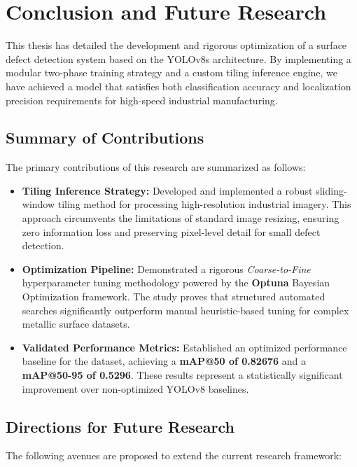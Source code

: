 \chapter{Conclusion and Future Research}
\label{chap:conclusion}

This thesis has detailed the development and rigorous optimization of a surface defect detection system based on the YOLOv8s architecture. By implementing a modular two-phase training strategy and a custom tiling inference engine, we have achieved a model that satisfies both classification accuracy and localization precision requirements for high-speed industrial manufacturing.

\section{Summary of Contributions}

The primary contributions of this research are summarized as follows:

\begin{itemize}
    \item \textbf{Tiling Inference Strategy:} Developed and implemented a robust sliding-window tiling method for processing high-resolution industrial imagery. This approach circumvents the limitations of standard image resizing, ensuring zero information loss and preserving pixel-level detail for small defect detection.
    
    \item \textbf{Optimization Pipeline:} Demonstrated a rigorous \textit{Coarse-to-Fine} hyperparameter tuning methodology powered by the \textbf{Optuna} Bayesian Optimization framework. The study proves that structured automated searches significantly outperform manual heuristic-based tuning for complex metallic surface datasets.
    
    \item \textbf{Validated Performance Metrics:} Established an optimized performance baseline for the dataset, achieving a \textbf{mAP@50 of 0.82676} and a \textbf{mAP@50-95 of 0.5296}. These results represent a statistically significant improvement over non-optimized YOLOv8 baselines.
\end{itemize}

\section{Directions for Future Research}

The following avenues are proposed to extend the current research framework:

